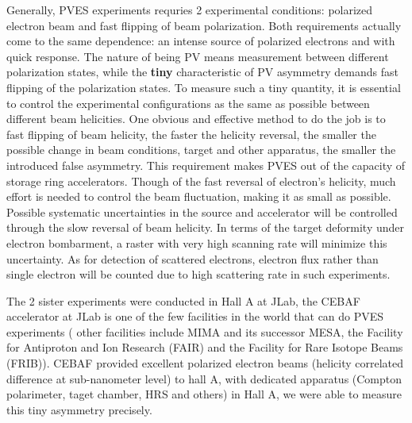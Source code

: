 Generally, PVES experiments requries 2 experimental conditions: polarized electron
beam and fast flipping of beam polarization. Both requirements actually come to 
the same dependence: an intense source of polarized electrons and with quick response. 
The nature of being PV means measurement between different polarization states, 
while the \textbf{tiny} characteristic of PV asymmetry
demands fast flipping of the polarization states.
To measure such a tiny quantity, it is essential to control
the experimental configurations as the same as possible between different
beam helicities. One obvious and effective method to do the job is to fast 
flipping of beam helicity, the faster the helicity reversal, the smaller
the possible change in beam conditions, target and other apparatus, the smaller
the introduced false asymmetry. This requirement makes PVES out of the capacity
of storage ring accelerators.
Though of the fast reversal of electron's helicity, much effort is needed to
control the beam fluctuation, making it as small as possible. Possible systematic
uncertainties in the source and accelerator will be controlled through the slow
reversal of beam helicity. In terms of the target deformity under electron bombarment,
a raster with very high scanning rate will minimize this uncertainty. As for 
detection of scattered electrons, electron flux rather than single electron will
be counted due to high scattering rate in such experiments.

The 2 sister experiments were conducted in Hall A at JLab, the CEBAF accelerator 
at JLab is one of the few facilities in the world that can do PVES experiments (
other facilities include MIMA and its successor MESA, the Facility for Antiproton
and Ion Research (FAIR) and the Facility for Rare Isotope Beams (FRIB)). CEBAF 
provided excellent polarized electron beams (helicity correlated difference at 
sub-nanometer level) to hall A, with dedicated apparatus 
(Compton polarimeter, taget chamber, HRS and others) in Hall A, we were able 
to measure this tiny asymmetry precisely.

